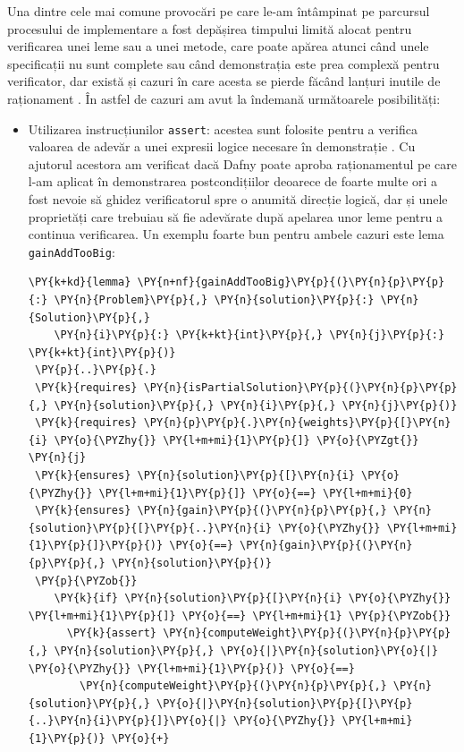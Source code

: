 \begin{sloppypar}
 \par
Una dintre cele mai comune provocări pe care le-am întâmpinat pe parcursul procesului de implementare a fost depășirea timpului limită alocat pentru verificarea unei leme sau a unei metode, care poate apărea atunci când unele specificații nu sunt complete sau când demonstrația este prea complexă pentru verificator, dar există și cazuri în care acesta se pierde făcând lanțuri inutile de raționament \cite{verification_optimization}. În astfel de cazuri am avut la îndemană următoarele posibilități:
\begin{itemize}
    \item Utilizarea instrucțiunilor \texttt{assert}: acestea sunt folosite pentru a verifica valoarea de adevăr a unei expresii logice necesare în demonstrație \cite{leino2021dafny}. Cu ajutorul acestora am verificat dacă Dafny poate aproba raționamentul pe care l-am aplicat în demonstrarea postcondițiilor deoarece de foarte multe ori a fost nevoie să ghidez verificatorul spre o anumită direcție logică, dar și unele proprietăți care trebuiau să fie adevărate după apelarea unor leme pentru a continua verificarea. Un exemplu foarte bun pentru ambele cazuri este lema \texttt{gainAddTooBig}:
   \begin{Verbatim}[commandchars=\\\{\}]
\PY{k+kd}{lemma} \PY{n+nf}{gainAddTooBig}\PY{p}{(}\PY{n}{p}\PY{p}{:} \PY{n}{Problem}\PY{p}{,} \PY{n}{solution}\PY{p}{:} \PY{n}{Solution}\PY{p}{,} 
    \PY{n}{i}\PY{p}{:} \PY{k+kt}{int}\PY{p}{,} \PY{n}{j}\PY{p}{:} \PY{k+kt}{int}\PY{p}{)} 
 \PY{p}{..}\PY{p}{.}
 \PY{k}{requires} \PY{n}{isPartialSolution}\PY{p}{(}\PY{n}{p}\PY{p}{,} \PY{n}{solution}\PY{p}{,} \PY{n}{i}\PY{p}{,} \PY{n}{j}\PY{p}{)}
 \PY{k}{requires} \PY{n}{p}\PY{p}{.}\PY{n}{weights}\PY{p}{[}\PY{n}{i} \PY{o}{\PYZhy{}} \PY{l+m+mi}{1}\PY{p}{]} \PY{o}{\PYZgt{}} \PY{n}{j}
 \PY{k}{ensures} \PY{n}{solution}\PY{p}{[}\PY{n}{i} \PY{o}{\PYZhy{}} \PY{l+m+mi}{1}\PY{p}{]} \PY{o}{==} \PY{l+m+mi}{0}
 \PY{k}{ensures} \PY{n}{gain}\PY{p}{(}\PY{n}{p}\PY{p}{,} \PY{n}{solution}\PY{p}{[}\PY{p}{..}\PY{n}{i} \PY{o}{\PYZhy{}} \PY{l+m+mi}{1}\PY{p}{]}\PY{p}{)} \PY{o}{==} \PY{n}{gain}\PY{p}{(}\PY{n}{p}\PY{p}{,} \PY{n}{solution}\PY{p}{)}
 \PY{p}{\PYZob{}}
    \PY{k}{if} \PY{n}{solution}\PY{p}{[}\PY{n}{i} \PY{o}{\PYZhy{}} \PY{l+m+mi}{1}\PY{p}{]} \PY{o}{==} \PY{l+m+mi}{1} \PY{p}{\PYZob{}}
      \PY{k}{assert} \PY{n}{computeWeight}\PY{p}{(}\PY{n}{p}\PY{p}{,} \PY{n}{solution}\PY{p}{,} \PY{o}{|}\PY{n}{solution}\PY{o}{|} \PY{o}{\PYZhy{}} \PY{l+m+mi}{1}\PY{p}{)} \PY{o}{==} 
        \PY{n}{computeWeight}\PY{p}{(}\PY{n}{p}\PY{p}{,} \PY{n}{solution}\PY{p}{,} \PY{o}{|}\PY{n}{solution}\PY{p}{[}\PY{p}{..}\PY{n}{i}\PY{p}{]}\PY{o}{|} \PY{o}{\PYZhy{}} \PY{l+m+mi}{1}\PY{p}{)} \PY{o}{+} 

\end{Verbatim}
\end{itemize}
\end{sloppypar}
